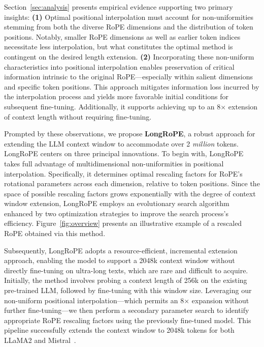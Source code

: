 Section~\ref{sec:analysis} presents empirical evidence supporting two primary insights: \textbf{(1)} Optimal positional interpolation must account for non-uniformities stemming from both the diverse RoPE dimensions and the distribution of token positions. Notably, smaller RoPE dimensions as well as earlier token indices necessitate less interpolation, but what constitutes the optimal method is contingent on the desired length extension. \textbf{(2)} Incorporating these non-uniform characteristics into positional interpolation enables preservation of critical information intrinsic to the original RoPE—especially within salient dimensions and specific token positions. This approach mitigates information loss incurred by the interpolation process and yields more favorable initial conditions for subsequent fine-tuning. Additionally, it supports achieving up to an 8$\times$ extension of context length without requiring fine-tuning.

Prompted by these observations, we propose \textbf{LongRoPE}, a robust approach for extending the LLM context window to accommodate over 2 \emph{million} tokens. LongRoPE centers on three principal innovations. To begin with, {LongRoPE} takes full advantage of multidimensional non-uniformities in positional interpolation. Specifically, it determines optimal rescaling factors for RoPE's rotational parameters across each dimension, relative to token positions. Since the space of possible rescaling factors grows exponentially with the degree of context window extension, {LongRoPE} employs an evolutionary search algorithm enhanced by two optimization strategies to improve the search process's efficiency. Figure~\ref{fig:overview} presents an illustrative example of a rescaled RoPE obtained via this method.

Subsequently, {LongRoPE} adopts a resource-efficient, incremental extension approach, enabling the model to support a 2048k context window without directly fine-tuning on ultra-long texts, which are rare and difficult to acquire. Initially, the method involves probing a context length of 256k on the existing pre-trained LLM, followed by fine-tuning with this window size. Leveraging our non-uniform positional interpolation—which permits an 8$\times$ expansion without further fine-tuning—we then perform a secondary parameter search to identify appropriate RoPE rescaling factors using the previously fine-tuned model. This pipeline successfully extends the context window to 2048k tokens for both LLaMA2 and Mistral~\cite{mistral}.

